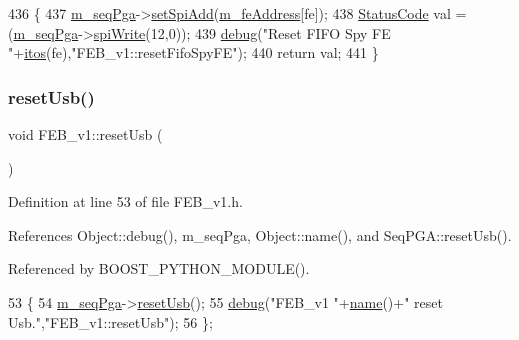 \begin{DoxyCode}
436                                        \{  
437   \hyperlink{classFEB__v1_a6c7804ac86796f233a8393043adf2e77}{m\_seqPga}->\hyperlink{classSeqPGA_ac998ce3a6d9b5f2e88cc8393f8c1df53}{setSpiAdd}(\hyperlink{classFEB__v1_a4e1945c2d5b434125f375e9d0fc6d99f}{m\_feAddress}[fe]);
438   \hyperlink{classStatusCode}{StatusCode} val = (\hyperlink{classFEB__v1_a6c7804ac86796f233a8393043adf2e77}{m\_seqPga}->\hyperlink{classSeqPGA_ad4421841ce4ce8b88ad13f63216f0743}{spiWrite}(12,0));
439   \hyperlink{classObject_aac010553f022165573714b7014a15f0d}{debug}(\textcolor{stringliteral}{"Reset FIFO Spy FE "}+\hyperlink{Tools_8h_af330027dbdafb9a30768b3613c553e60}{itos}(fe),\textcolor{stringliteral}{"FEB\_v1::resetFifoSpyFE"});
440   \textcolor{keywordflow}{return} val;
441 \}
\end{DoxyCode}
\mbox{\label{classFEB__v1_aa545951bdeab3e1dd600336c313c7769}} 
\subsubsection{\texorpdfstring{reset\+Usb()}{resetUsb()}}
{\footnotesize\ttfamily void F\+E\+B\+\_\+v1\+::reset\+Usb (\begin{DoxyParamCaption}{ }\end{DoxyParamCaption})\hspace{0.3cm}{\ttfamily [inline]}}



Definition at line 53 of file F\+E\+B\+\_\+v1.\+h.



References Object\+::debug(), m\+\_\+seq\+Pga, Object\+::name(), and Seq\+P\+G\+A\+::reset\+Usb().



Referenced by B\+O\+O\+S\+T\+\_\+\+P\+Y\+T\+H\+O\+N\+\_\+\+M\+O\+D\+U\+L\+E().


\begin{DoxyCode}
53                   \{
54     \hyperlink{classFEB__v1_a6c7804ac86796f233a8393043adf2e77}{m\_seqPga}->\hyperlink{classSeqPGA_aea7d31e0cce81ea4dcad7d4534ff4493}{resetUsb}();
55     \hyperlink{classObject_aac010553f022165573714b7014a15f0d}{debug}(\textcolor{stringliteral}{"FEB\_v1 "}+\hyperlink{classObject_a300f4c05dd468c7bb8b3c968868443c1}{name}()+\textcolor{stringliteral}{" reset Usb."},\textcolor{stringliteral}{"FEB\_v1::resetUsb"});
56   \};
\end{DoxyCode}
\mbox{\label{classFEB__v1_a8bf655504f9b0c51d5aa5bc6b30da00d}} 
